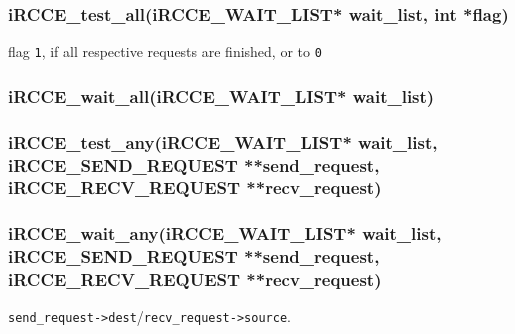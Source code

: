 \documentclass[fontsize=10pt, paper=a4, DIV12, pagesize=auto]{scrartcl}
\begin{document}
\subsubsection{iRCCE\_test\_all(iRCCE\_WAIT\_LIST* wait\_list, int *flag)}\vspace{-0.3cm}
flag \texttt{1}, if all respective requests are finished, or to \texttt{0}
\subsubsection{iRCCE\_wait\_all(iRCCE\_WAIT\_LIST* wait\_list)}\vspace{-0.3cm}
\subsubsection{iRCCE\_test\_any(iRCCE\_WAIT\_LIST* wait\_list, iRCCE\_SEND\_REQUEST **send\_request, \\ 
\hspace{7.45cm} iRCCE\_RECV\_REQUEST **recv\_request)}\vspace{-0.3cm}
\subsubsection{iRCCE\_wait\_any(iRCCE\_WAIT\_LIST* wait\_list, iRCCE\_SEND\_REQUEST **send\_request, \\ 
\hspace{7.5cm} iRCCE\_RECV\_REQUEST **recv\_request)}\vspace{-0.3cm}
\texttt{send\_request->dest}/\texttt{recv\_request->source}.
\end{document}
